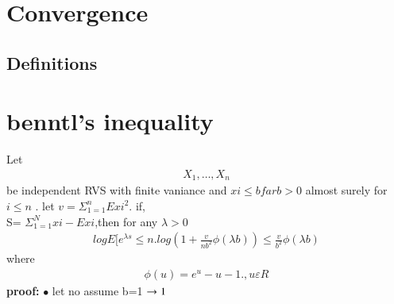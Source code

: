 \documentclass[journal,12pt,twocolumn]{IEEEtran}
\begin{document}
% 



\maketitle
\section{Convergence}
\subsection{Definitions}
\section{benntl's inequality}
Let
\begin{align}
X_1, \dots, X_n
\end{align}
be independent RVS with finite vaniance and $xi \leqslant b far b> 0$ almost surely for $i\leqslant n$ . let $v= \Sigma_{1=1}^{n} E xi^2.$ if,\\

S= $\Sigma_{1=1}^{N} xi- Exi$,then for any $\lambda > 0$\\
\begin{align}
log E[e^{\lambda s}\leqslant n. log(1+\frac{v}{nb^2} \phi (\lambda b))\leqslant \frac{v}{b^2} \phi (\lambda b) 
\end{align}
where 
\begin{align}
\phi (u)=e^u-u-1.,u\varepsilon R
\end{align}
\textbf{proof:} $\bullet$ let no assume b=1 $\rightarrow\\ 1$\\
\end{document}
